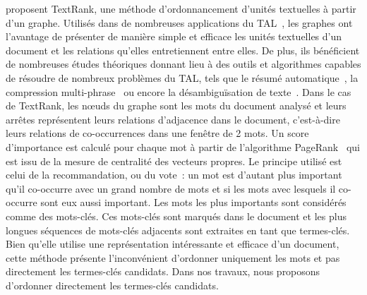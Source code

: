      proposent TextRank, une méthode
    d'ordonnancement d'unités textuelles à partir d'un graphe. Utilisés dans de
    nombreuses applications du TAL~\cite{kozareva2013textgraphs}, les graphes
    ont l'avantage de présenter de manière simple et efficace les unités
    textuelles d'un document et les relations qu'elles entretiennent entre
    elles. De plus, ils bénéficient de nombreuses études théoriques donnant lieu
    à des outils et algorithmes capables de résoudre de nombreux problèmes du
    TAL, tels que le résumé automatique~\cite{wan2007iterativereinforcement}, la
    compression multi-phrase~\cite{boudin2013multisentencecompression} ou encore
    la désambiguïsation de texte~\cite{schwab2013desambiguisation}. Dans le cas
    de TextRank, les n\oe{}uds du graphe sont les mots du document analysé et
    leurs arrêtes représentent leurs relations d'adjacence dans le document,
    c'est-à-dire leurs relations de co-occurrences dans une fenêtre de 2 mots.
    Un score d'importance est calculé pour chaque mot à partir de l'algorithme
    PageRank~\cite{brin1998pagerank} qui est issu de la mesure de centralité des
    vecteurs propres. Le principe utilisé est celui de la recommandation, ou du
    vote~: un mot est d'autant plus important qu'il co-occurre avec un grand
    nombre de mots et si les mots avec lesquels il co-occurre sont eux aussi
    important. Les mots les plus importants sont considérés comme des mots-clés.
    Ces mots-clés sont marqués dans le document et les plus longues séquences de
    mots-clés adjacents sont extraites en tant que termes-clés. Bien qu'elle
    utilise une représentation intéressante et efficace d'un document, cette
    méthode présente l'inconvénient d'ordonner uniquement les mots et pas
    directement les termes-clés candidats. Dans nos travaux, nous proposons
    d'ordonner directement les termes-clés candidats.

